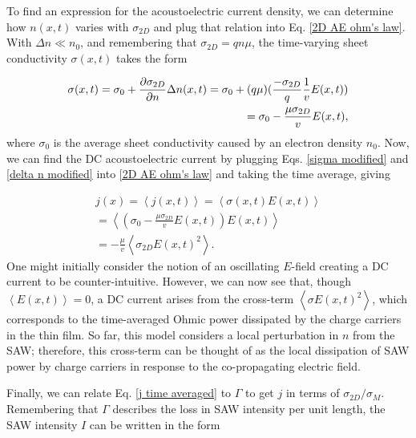 \documentclass[double,12pt,1in]{beavtex}
\begin{document}
To find an expression for the acoustoelectric current density, we can determine how $n(x,t)$ varies with $\sigma_{2D}$ and plug that relation into Eq. \ref{2D AE ohm's law}. With $\Delta n \ll n_0$, and remembering that $\sigma_{2D} = q n \mu$, the time-varying sheet conductivity $\sigma(x,t)$ takes the form

\begin{equation}
    \begin{split}
        \sigma(x,t) = \sigma_0 + \pdv{\sigma_{2D}}{n} \Delta n(x,t) = \sigma_0 + (q \mu)(\frac{-\sigma_{2D}}{q} \frac{1}{v}E(x,t)) \\
        = \sigma_0 - \frac{\mu \sigma_{2D}}{v}E(x,t),
    \end{split}
    \label{sigma modified}
\end{equation}
where $\sigma_0$ is the average sheet conductivity caused by an electron density $n_0$. Now, we can find the DC acoustoelectric current by plugging Eqs. \ref{sigma modified} and \ref{delta n modified} into \ref{2D AE ohm's law} and taking the time average, giving

\begin{equation}
    \begin{split}
        j(x) = \left\langle j(x,t) \right\rangle = \left\langle \sigma(x,t) E(x,t) \right\rangle \\
        = \left\langle \left( \sigma_0 - \frac{\mu \sigma_{2D}}{v}E(x,t) \right) E(x,t)  \right\rangle \\
        = - \frac{\mu}{v}\left\langle\sigma_{2D} E(x,t)^2\right\rangle. 
    \end{split}
    \label{j time averaged}
\end{equation}
One might initially consider the notion of an oscillating $E$-field creating a DC current to be counter-intuitive. However, we can now see that, though $\left\langle E(x,t) \right\rangle = 0$, a DC current arises from the cross-term $\left\langle \sigma E(x,t) ^2 \right\rangle$, which corresponds to the time-averaged Ohmic power dissipated by the charge carriers in the thin film. So far, this model considers a local perturbation in $n$ from the SAW; therefore, this cross-term can be thought of as the local dissipation of SAW power by charge carriers in response to the co-propagating electric field. 

Finally, we can relate Eq. \ref{j time averaged} to $\Gamma$ to get $j$ in terms of $\sigma_{2D}/\sigma_M$. Remembering that $\Gamma$ describes the loss in SAW intensity per unit length, the SAW intensity $I$ can be written in the form
\end{document}
